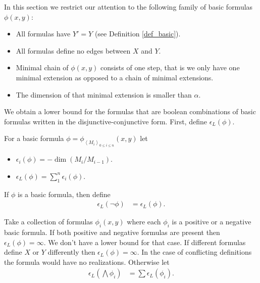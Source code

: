\documentclass{amsart}
\newcommand{\X}{X}
\newcommand{\Y}{Y}
\newcommand{\paren}[1]{\left(#1\right)}
\newcommand{\agl}[1]{\left\langle #1 \right\rangle}
\begin{document}
In this section we restrict our attention to the following family of basic formulas $\phi(x,y)$:
\begin{itemize}
\item All formulas have $\Y' = \Y$ (see Definition \ref{def_basic}).
\item All formulas define no edges between $X$ and $Y$.
\item Minimal chain of $\phi(x,y)$ consists of one step, that is we only have one minimal extension as opposed to a chain of minimal extensions.
\item The dimension of that minimal extension is smaller than $\alpha$.
\end{itemize}

We obtain a lower bound for the formulas that are boolean combinations of basic formulas written in the disjunctive-conjunctive form.
First, define $\epsilon_L(\phi)$.

\begin{Definition} 
  For a basic formula $\phi = \phi_{\agl{M_i}_{0 \leq i \leq n}}(x, y)$ let
  \begin{itemize}
  \item $\epsilon_i(\phi) = -\dim \paren{M_i/M_{i-1}}$.
  \item $\epsilon_L(\phi) = \sum_1^{n} \epsilon_i(\phi)$.
  \end{itemize}
\end{Definition}

\begin{Definition}[Negation]
  If $\phi$ is a basic formula, then define
  \begin{align*}
    \epsilon_L(\neg \phi) &= \epsilon_L(\phi).
  \end{align*}
\end{Definition}

\begin{Definition}[Conjunction]
  Take a collection of formulas $\phi_i(x, y)$ where each $\phi_i$ is a positive or a negative basic formula.
  If both positive and negative formulas are present then $\epsilon_L(\phi) = \infty$.
  We don't have a lower bound for that case.
  If different formulas define $\X$ or $\Y$ differently then $\epsilon_L(\phi) = \infty$.
  In the case of conflicting definitions the formula would have no realizations.
  Otherwise let
  \begin{align*}
    \epsilon_L\paren{\bigwedge \phi_i} &= \sum \epsilon_L(\phi_i).
  \end{align*}
\end{Definition}
\end{document}
